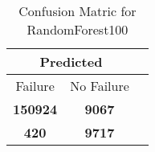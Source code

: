 \begin{table}[] 
\caption{Confusion Matric for RandomForest100} 
\label{Table: Prediction Accuracy-NoneRandomForest100SVMEKF-ignoreReflection-Reflection} 
\centering 
\begin{tabular} 
 {@{}ccc@{}} 
\toprule 
\multicolumn{2}{c}{\textbf{Predicted}}
 \\ \midrule 
\multicolumn{1}{|c|}{Failure} & 
\multicolumn{1}{c|}{No Failure}
 \\ \midrule 
\multicolumn{1}{|c|}{\color{green}\textbf{150924}} & 
\multicolumn{1}{c|}{\color{red}\textbf{9067}}
 \\ \midrule 
\multicolumn{1}{|c|}{\color{red}\textbf{420}} & 
\multicolumn{1}{c|}{\color{green}\textbf{9717}}
 \\ \bottomrule 
\end{tabular} 
\end{table} 
